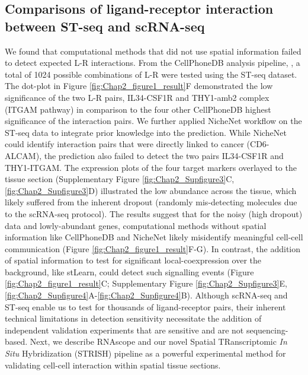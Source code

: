 \subsection{Comparisons of ligand-receptor interaction between ST-seq and scRNA-seq}
We found that computational methods that did not use spatial information failed to detect expected L-R interactions. From the CellPhoneDB analysis pipeline, \cite{efremova2020cellphonedb}, a total of 1024 possible combinations of L-R were tested using the ST-seq dataset. The dot-plot in Figure \ref{fig:Chap2_figure1_result}F demonstrated the low significance of the two L-R pairs, IL34-CSF1R and THY1-amb2 complex (ITGAM pathway) in comparison to the four other CellPhoneDB highest significance of the interaction pairs. We further applied NicheNet \cite{browaeys2020nichenet} workflow on the ST-seq data to integrate prior knowledge into the prediction. While NicheNet could identify interaction pairs that were directly linked to cancer (\ie CD6-ALCAM), the prediction also failed to detect the two pairs IL34-CSF1R and THY1-ITGAM. The expression plots of the four target markers overlayed to the tissue section (Supplementary Figure \ref{fig:Chap2_Supfigure3}C, \ref{fig:Chap2_Supfigure3}D) illustrated the low abundance across the tissue, which likely suffered from the inherent dropout (randomly mis-detecting molecules due to the scRNA-seq protocol). The results suggest that for the noisy (high dropout) data and lowly-abundant genes, computational methods without spatial information like CellPhoneDB and NicheNet likely misidentify meaningful cell-cell communication (Figure \ref{fig:Chap2_figure1_result}F-G). In contrast, the addition of spatial information to test for significant local-coexpression over the background, like stLearn, could detect such signalling events (Figure \ref{fig:Chap2_figure1_result}C; Supplementary Figure \ref{fig:Chap2_Supfigure3}E,  \ref{fig:Chap2_Supfigure4}A-\ref{fig:Chap2_Supfigure4}B). Although scRNA-seq and ST-seq enable us to test for thousands of ligand-receptor pairs, their inherent technical limitations in detection sensitivity necessitate the addition of independent validation experiments that are sensitive and are not sequencing-based. Next, we describe RNAscope and our novel Spatial TRanscriptomic \textit{In Situ} Hybridization (STRISH) pipeline as a powerful experimental method for validating cell-cell interaction within spatial tissue sections. 

